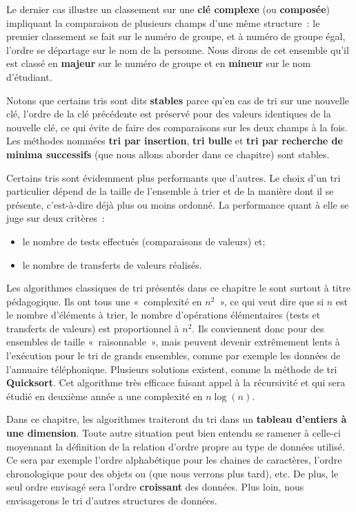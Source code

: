 	Le dernier cas illustre un classement sur une \textbf{clé complexe}
	(ou \textbf{composée}) impliquant la comparaison de plusieurs champs
	d’une même structure~: le premier classement se fait sur le numéro de
	groupe, et à numéro de groupe égal, l’ordre se départage sur le nom de
	la personne. Nous dirons de cet ensemble qu’il est classé en \textbf{majeur}
	sur le numéro de groupe et en \textbf{mineur} sur le nom d’étudiant.

	Notons que certains tris sont dits \textbf{stables} parce qu’en cas de tri
	sur une nouvelle clé, l’ordre de la clé précédente est préservé pour des
	valeurs identiques de la nouvelle clé, ce qui évite de faire des
	comparaisons sur les deux champs à la fois. Les méthodes nommées \textbf{tri
	par insertion}, \textbf{tri bulle} et \textbf{tri par recherche de minima
	successifs} (que nous allons aborder dans ce chapitre) sont stables.

	Certains tris sont évidemment plus performants que d’autres. Le choix d’un
	tri particulier dépend de la taille de l’ensemble à trier et de la manière
	dont il se présente, c’est-à-dire déjà plus ou moins ordonné.  La
	performance quant à elle se juge sur deux critères~: 
	\begin{itemize}
		\item le nombre de tests effectués (comparaisons de valeurs) et;
		\item le nombre de transferts de valeurs réalisés. 
	\end{itemize}
	
	
	Les algorithmes classiques de tri présentés dans ce chapitre le sont surtout
	à titre pédagogique. Ils ont tous une «~complexité en $n^2$~», ce qui veut
	dire que si $n$ est le nombre d’éléments à trier, le nombre d’opérations
	élémentaires (tests et transferts de valeurs) est proportionnel à $n^2$. Ils
	conviennent donc pour des ensembles de taille «~raisonnable~», mais peuvent
	devenir extrêmement lents à l’exécution pour le tri de grands ensembles,
	comme par exemple les données de l’annuaire téléphonique. Plusieurs
	solutions existent, comme la méthode de tri \textbf{Quicksort}. Cet
	algorithme très efficace faisant appel à la récursivité et qui sera étudié
	en deuxième année a une complexité en $n \log(n)$. 

	
	Dans ce chapitre, les algorithmes traiteront du tri dans un \textbf{tableau
	d’entiers à une dimension}. Toute autre situation peut bien entendu se
	ramener à celle-ci moyennant la définition de la relation d’ordre propre au
	type de données utilisé. Ce sera par exemple l’ordre alphabétique pour les
	chaines de caractères, l’ordre chronologique pour des objets  ou
	 (que nous verrons plus tard), etc. De plus, le seul ordre
	envisagé sera l’ordre \textbf{croissant} des données. Plus loin, nous
	envisagerons le tri d’autres structures de données.

